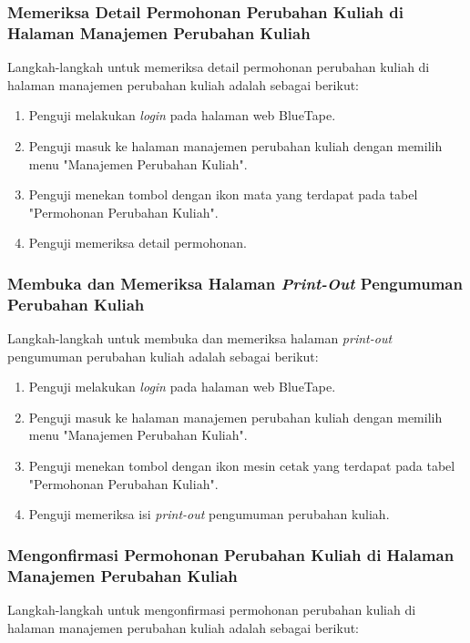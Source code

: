 \subsubsection{Memeriksa Detail Permohonan Perubahan Kuliah di Halaman Manajemen Perubahan Kuliah}
\label{subsubsec:skenario_memeriksa_detail_permohonan_perubahan_kuliah_di_halaman_manajemen_perubahan_kuliah}
Langkah-langkah untuk memeriksa detail permohonan perubahan kuliah di halaman manajemen perubahan kuliah adalah sebagai berikut:

\begin{enumerate}
    \item Penguji melakukan \textit{login} pada halaman web BlueTape.
    \item Penguji masuk ke halaman manajemen perubahan kuliah dengan memilih menu "Manajemen Perubahan Kuliah".
    \item Penguji menekan tombol dengan ikon mata yang terdapat pada tabel "Permohonan Perubahan Kuliah".
    \item Penguji memeriksa detail permohonan.
\end{enumerate}

\subsubsection{Membuka dan Memeriksa Halaman \textit{Print-Out} Pengumuman Perubahan Kuliah}
\label{subsubsec:skenario_membuka_dan_memeriksa_halaman_print_out_pengumuman_perubahan_kuliah}
Langkah-langkah untuk membuka dan memeriksa halaman \textit{print-out} pengumuman perubahan kuliah adalah sebagai berikut:

\begin{enumerate}
    \item Penguji melakukan \textit{login} pada halaman web BlueTape.
    \item Penguji masuk ke halaman manajemen perubahan kuliah dengan memilih menu "Manajemen Perubahan Kuliah".
    \item Penguji menekan tombol dengan ikon mesin cetak yang terdapat pada tabel "Permohonan Perubahan Kuliah".
    \item Penguji memeriksa isi \textit{print-out} pengumuman perubahan kuliah.
\end{enumerate}

\subsubsection{Mengonfirmasi Permohonan Perubahan Kuliah di Halaman Manajemen Perubahan Kuliah}
\label{subsubsec:skenario_mengonfirmasi_permohonan_perubahan_kuliah_di_halaman_manajemen_perubahan_kuliah}
Langkah-langkah untuk mengonfirmasi permohonan perubahan kuliah di halaman manajemen perubahan kuliah adalah sebagai berikut:

